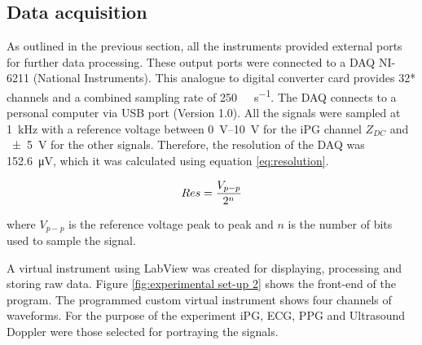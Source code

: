 \subsection{Data acquisition}
\label{section procedure 1.2}

As outlined in the previous section, all the instruments provided external ports for further data processing. These output ports were connected to a DAQ NI-6211 (National Instruments). This analogue to digital converter card provides 32* channels and a combined sampling rate of \SI{250}{\kilo\sample\per\second}. The DAQ connects to a personal computer via USB port (Version 1.0). All the signals were sampled at \SI{1}{\kilo\hertz} with a reference voltage between \SIrange{0}{10}{\volt} for the iPG channel $Z_{DC}$ and \SI{\pm 5}{\volt} for the other signals. Therefore, the resolution of the DAQ was \SI{152.6}{\micro\volt}, which it was calculated using equation \ref{eq:resolution}. 

\begin{align}
	\label{eq:resolution}
	Res =\frac{V_{p-p}}{2^{n}}		\tagaddtext{[\si{\volt}]}
\end{align}

where $V_{p-p}$ is the reference voltage peak to peak and $n$ is the number of bits used to sample the signal. 

A virtual instrument using LabView \cite{LabView:2016} was created for displaying, processing and storing raw data. Figure \ref{fig:experimental set-up 2} shows the front-end of the program. The programmed custom virtual instrument shows four channels of waveforms. For the purpose of the experiment iPG, ECG, PPG and Ultrasound Doppler were those selected for portraying the signals.

